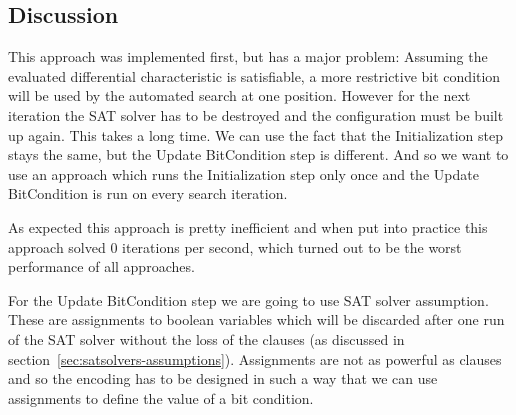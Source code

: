 \subsection{Discussion}
\label{sec:simple-evaluation-discussion}
%
This approach was implemented first, but has a major problem: Assuming the evaluated differential characteristic is satisfiable, a more restrictive bit condition will be used by the automated search at one position. However for the next iteration the SAT solver has to be destroyed and the configuration must be built up again. This takes a long time. We can use the fact that the Initialization step stays the same, but the Update BitCondition step is different. And so we want to use an approach which runs the Initialization step only once and the Update BitCondition is run on every search iteration.

As expected this approach is pretty inefficient and when put into practice this approach solved $0$ iterations per second, which turned out to be the worst performance of all approaches.

For the Update BitCondition step we are going to use SAT solver assumption. These are assignments to boolean variables which will be discarded after one run of the SAT solver without the loss of the clauses (as discussed in section~\ref{sec:satsolvers-assumptions}). Assignments are not as powerful as clauses and so the encoding has to be designed in such a way that we can use assignments to define the value of a bit condition.


